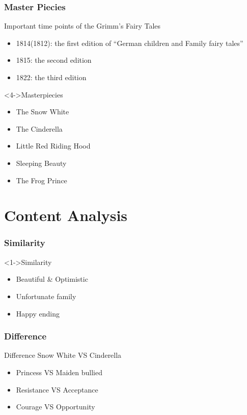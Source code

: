 \documentclass{beamer}
\begin{document}
\begin{frame}
    \frametitle{Master Piecies}
    \begin{block}{Important time points of the Grimm's Fairy Tales}
        \begin{itemize}
            \item<1-> 1814(1812): the first edition of ``German children and Family fairy tales''\cite[baidu]{baidubaike}\cite[wiki]{wikipedia}
            \item<2-> 1815: the second edition
            \item<3-> 1822: the third edition %
        \end{itemize}
    \end{block}
    \begin{block}<4->{Masterpiecies}
        \begin{itemize}
            \item<5-> \alert{The Snow White}
            \item<5-> \alert{The Cinderella}
            \item<4-> Little Red Riding Hood
            \item<4-> Sleeping Beauty
            \item<4-> The Frog Prince
        \end{itemize}
    \end{block}
\end{frame}

\section{Content Analysis}

\begin{frame}
    \frametitle{Similarity}
    \Large
    \begin{block}<1->{Similarity}
        \begin{itemize}
            \item Beautiful \& Optimistic
            \item Unfortunate family
            \item Happy ending
        \end{itemize}
    \end{block}
\end{frame}

\begin{frame}
    \frametitle{Difference}
    \Large
    \begin{block}{Difference}
        Snow White \alert{VS} Cinderella
        \begin{itemize}
            \item Princess \alert{VS} Maiden bullied
            \item Resistance \alert{VS} Acceptance
            \item Courage \alert{VS} Opportunity
        \end{itemize}
    \end{block}
\end{frame}
\end{document}
